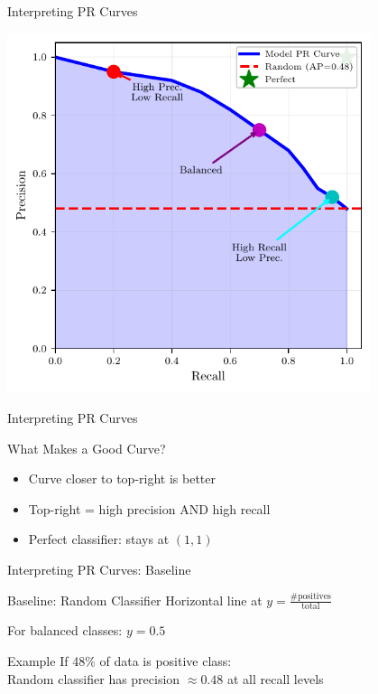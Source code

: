 \documentclass{beamer}
\begin{document}
\begin{frame}{Interpreting PR Curves}
\begin{center}
\includegraphics[width=0.8\textwidth]{pr-curve-diagram.pdf}
\end{center}

\end{frame}

\begin{frame}{Interpreting PR Curves}
\begin{keypointsbox}{What Makes a Good Curve?}
\begin{itemize}
    \item Curve closer to top-right is better
    \item Top-right = high precision AND high recall
    \item Perfect classifier: stays at $(1, 1)$
\end{itemize}
\end{keypointsbox}
\end{frame}

\begin{frame}{Interpreting PR Curves: Baseline}
\begin{block}{Baseline: Random Classifier}
Horizontal line at $y = \frac{\text{\# positives}}{\text{total}}$

\vspace{0.15cm}

For balanced classes: $y = 0.5$
\end{block}

\vspace{0.2cm}

\begin{examplebox}{Example}
\small
If 48\% of data is positive class: \\
Random classifier has precision $\approx 0.48$ at all recall levels
\end{examplebox}
\end{frame}
\end{document}
